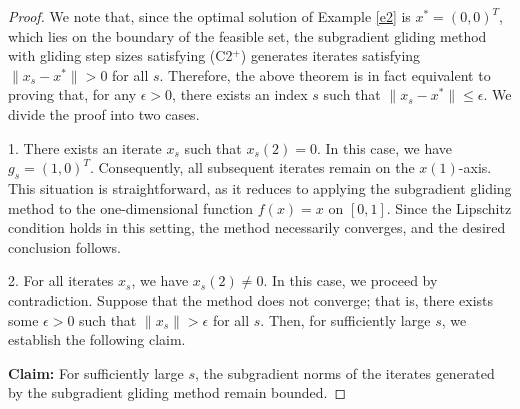 \documentclass[sn-mathphys]{JORSC-jnl}%
\theoremstyle{thmstyleone}%
\theoremstyle{thmstylethree}%
\begin{document}
\begin{proof}
	We note that, since the optimal solution of Example \ref{e2} is $x^* = (0,0)^T$, which lies on the boundary of the feasible set, the subgradient gliding method with gliding step sizes satisfying (C2$^+$) generates iterates satisfying $\|x_s - x^*\| > 0$ for all $s$. Therefore, the above theorem is in fact equivalent to proving that, for any $\epsilon > 0$, there exists an index $s$ such that $\|x_s - x^*\| \le \epsilon$. We divide the proof into two cases.
	
	1. There exists an iterate $x_s$ such that $x_s(2) = 0$. In this case, we have $g_s = (1,0)^T$. Consequently, all subsequent iterates remain on the $x(1)$-axis. This situation is straightforward, as it reduces to applying the subgradient gliding method to the one-dimensional function $f(x) = x$ on $[0,1]$. Since the Lipschitz condition holds in this setting, the method necessarily converges, and the desired conclusion follows.
	
	2. For all iterates $x_s$, we have $x_s(2) \neq 0$. In this case, we proceed by contradiction. Suppose that the method does not converge; that is, there exists some $\epsilon > 0$ such that $\|x_s\| > \epsilon$ for all $s$. Then, for sufficiently large $s$, we establish the following claim.
	
%	
%	
	
	\textbf{Claim:} For sufficiently large $s$, the subgradient norms of the iterates generated by the subgradient gliding method remain bounded.
	

\end{proof}
\end{document}
